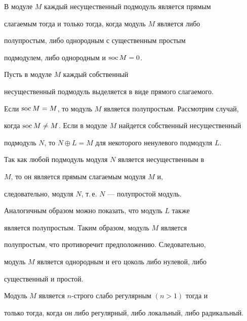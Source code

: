  


\begin{thm} 


В модуле $M$ каждый несущественный подмодуль является прямым 


слагаемым тогда и только тогда, когда модуль $M$ является либо 


полупростым, либо однородным с существенным простым 


подмодулем, либо однородным и $\operatorname{soc} M=0$. 


\end{thm} 


 


\begin{pf} 


Пусть в модуле $M$ каждый собственный 


несущественный подмодуль выделяется в виде прямого слагаемого. 


Если $\operatorname{soc} M=M$, то модуль $M$ является полупростым. Рассмотрим случай, 


когда $\operatorname{soc} M\ne M$. Если в модуле $M$ найдется собственный несущественный 


подмодуль $N$, то $N\oplus L=M$ для некоторого ненулевого подмодуля $L$. 


Так как любой подмодуль модуля $N$ является несущественным в 


$M$, то он является прямым слагаемым модуля $M$ и, 


следовательно, модуля $N$, т.\,е. $N$ --- полупростой модуль. 


Аналогичным образом можно показать, что модуль $L$ также 


является полупростым. Таким образом, модуль $M$ является 


полупростым, что противоречит предположению. Следовательно, 


модуль $M$ является однородным и его цоколь либо нулевой, либо 


существенный и простой. 


\end{pf} 


 


\begin{thm} 


Модуль $M$ является $n$-строго слабо регулярным $(n>1)$ тогда и 


только тогда, когда он либо регулярный, либо локальный, либо радикальный. 


\end{thm} 


